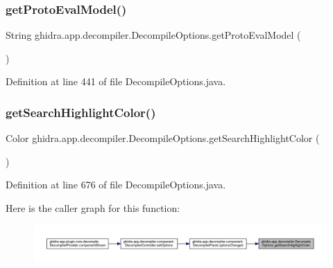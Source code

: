 \subsubsection{\texorpdfstring{getProtoEvalModel()}{getProtoEvalModel()}}
{\footnotesize\ttfamily String ghidra.\+app.\+decompiler.\+Decompile\+Options.\+get\+Proto\+Eval\+Model (\begin{DoxyParamCaption}{ }\end{DoxyParamCaption})\hspace{0.3cm}{\ttfamily [inline]}}



Definition at line 441 of file Decompile\+Options.\+java.

\mbox{\label{classghidra_1_1app_1_1decompiler_1_1_decompile_options_a97b81417116151cd6481043496bd66f1}} 
\subsubsection{\texorpdfstring{getSearchHighlightColor()}{getSearchHighlightColor()}}
{\footnotesize\ttfamily Color ghidra.\+app.\+decompiler.\+Decompile\+Options.\+get\+Search\+Highlight\+Color (\begin{DoxyParamCaption}{ }\end{DoxyParamCaption})\hspace{0.3cm}{\ttfamily [inline]}}



Definition at line 676 of file Decompile\+Options.\+java.

Here is the caller graph for this function\+:
\nopagebreak
\begin{figure}[H]
\begin{center}
\leavevmode
\includegraphics[width=350pt]{classghidra_1_1app_1_1decompiler_1_1_decompile_options_a97b81417116151cd6481043496bd66f1_icgraph}
\end{center}
\end{figure}
\mbox{\label{classghidra_1_1app_1_1decompiler_1_1_decompile_options_a9e9dbb09f818c09e9ab487f552d845cf}} 
